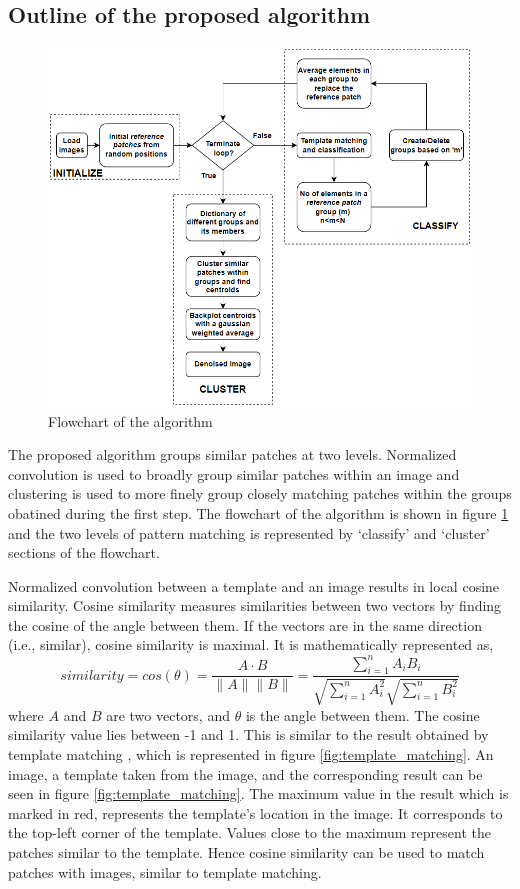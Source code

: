 \documentclass[fleqn,10pt]{wlscirep}
\begin{document}
\subsection*{Outline of the proposed algorithm}

\begin{figure}
	\centering
	\includegraphics[scale=0.7]{./imgs/flowchart.png}
	\caption{Flowchart of the algorithm}
	\label{fig:flowchart}
\end{figure} 

The proposed algorithm groups similar patches at two levels. Normalized convolution is used to broadly group similar patches within an image and clustering is used to more finely group closely matching patches within the groups obatined during the first step. The flowchart of the algorithm is shown in figure \ref{fig:flowchart} and the two levels of pattern matching is represented by `classify' and `cluster' sections of the flowchart.

Normalized convolution between a template and an image results in local cosine similarity. Cosine similarity  measures similarities between two vectors\cite{alake_understanding_2021} by finding the cosine of the angle between them. If the vectors are in the same direction (i.e., similar), cosine similarity is maximal. It is mathematically represented as,
\begin{equation}
	similarity = cos(\theta) = \frac{A\cdot B}{\|A\|\|B\|} = \frac{\sum_{i=1}^{n}A_i B_i}{\sqrt{\sum_{i=1}^{n}A_i^2}\sqrt{\sum_{i=1}^{n}B_i^2}}
\end{equation}
where $A$ and $B$ are two vectors, and $\theta$ is the angle between them. The cosine similarity value lies between -1 and 1. This is similar to the result obtained by template matching , which is represented in figure \ref{fig:template_matching}. An image, a template taken from the image, and the corresponding result can be seen in figure \ref{fig:template_matching}. The maximum value in the result which is marked in red, represents the template’s location in the image. It corresponds to the top-left corner of the template. Values close to the maximum represent the patches similar to the template. Hence cosine similarity can be used to match patches with images, similar to template matching.
\end{document}
